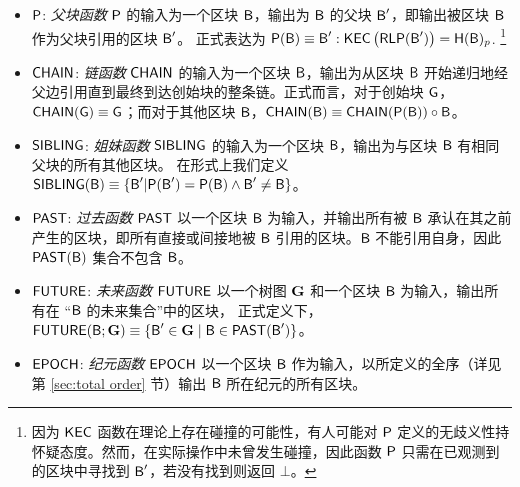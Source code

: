 \begin{itemize}[nosep]
	\item $\mathsf{P}$: \emph{父块函数} $\mathsf{P}$ 的输入为一个区块 $\textsf{B}$，输出为 $\textsf{B}$ 的父块 $\textsf{B}'$，即输出被区块 $\textsf{B}$ 作为父块引用的区块 $\textsf{B}'$。
	正式表达为 $\mathsf{P}(\textsf{B})\equiv \textsf{B}':\mathsf{KEC}\left(\mathsf{RLP}(\textsf{B}')\right)=\textsf{H}(\textsf{B})_{p}$.
	\footnote{因为 $\mathsf{KEC}$ 函数在理论上存在碰撞的可能性，有人可能对 $\mathsf{P}$ 定义的无歧义性持怀疑态度。然而，在实际操作中未曾发生碰撞，因此函数 $\mathsf{P}$ 只需在已观测到的区块中寻找到 $\textsf{B}'$，若没有找到则返回 $\bot$。
	}
	
	\item $\mathsf{CHAIN}$:  \emph{链函数} $\mathsf{CHAIN}$ 的输入为一个区块 $\textsf{B}$，输出为从区块 $\textsf{B}$ 开始递归地经父边引用直到最终到达创始块的整条链。正式而言，对于创始块 $\textsf{G}$，$\mathsf{CHAIN}(\textsf{G})\equiv\textsf{G}$；而对于其他区块 $\textsf{B}$，$\mathsf{CHAIN}(\textsf{B})\equiv\mathsf{CHAIN}(\mathsf{P}(\textsf{B}))\circ \textsf{B}$。
	
	
	\item $\mathsf{SIBLING}$:  \emph{姐妹函数} $\mathsf{SIBLING}$ 的输入为一个区块 $\textsf{B}$，输出为与区块 $\textsf{B}$ 有相同父块的所有其他区块。
	在形式上我们定义 $\mathsf{SIBLING}(\textsf{B})\equiv\{\textsf{B}'|\mathsf{P}(\textsf{B}')=\mathsf{P}(\textsf{B}) \wedge \textsf{B}'\neq \textsf{B}\}$。
	
	
	\item $\mathsf{PAST}$: \emph{过去函数} $\mathsf{PAST}$ 以一个区块 $\textsf{B}$ 为输入，并输出所有被 $\textsf{B}$ 承认在其之前产生的区块，即所有直接或间接地被 $\textsf{B}$ 引用的区块。$\textsf{B}$ 不能引用自身，因此 $\mathsf{PAST}(\textsf{B})$ 集合不包含 $\textsf{B}$。
	
	
	\item $\mathsf{FUTURE}$: \emph{未来函数} $\mathsf{FUTURE}$ 以一个树图  $\textbf{G}$ 和一个区块 $\textsf{B}$ 为输入，输出所有在 ``$\textsf{B}$ 的未来集合''中的区块，
	正式定义下，$\mathsf{FUTURE}(\textsf{B};\textbf{G})\equiv\{\textsf{B}' \in \textbf{G} \mid \textsf{B} \in \mathsf{PAST}(\textsf{B}')\}$。
	
	
	\item $\mathsf{EPOCH} $:  \emph{纪元函数} $\mathsf{EPOCH} $ 以一个区块 $\textsf{B}$ 作为输入，以\name 所定义的全序（详见第 \ref{sec:total order} 节）输出 $\textsf{B}$ 所在纪元的所有区块。 
	

\end{itemize}
